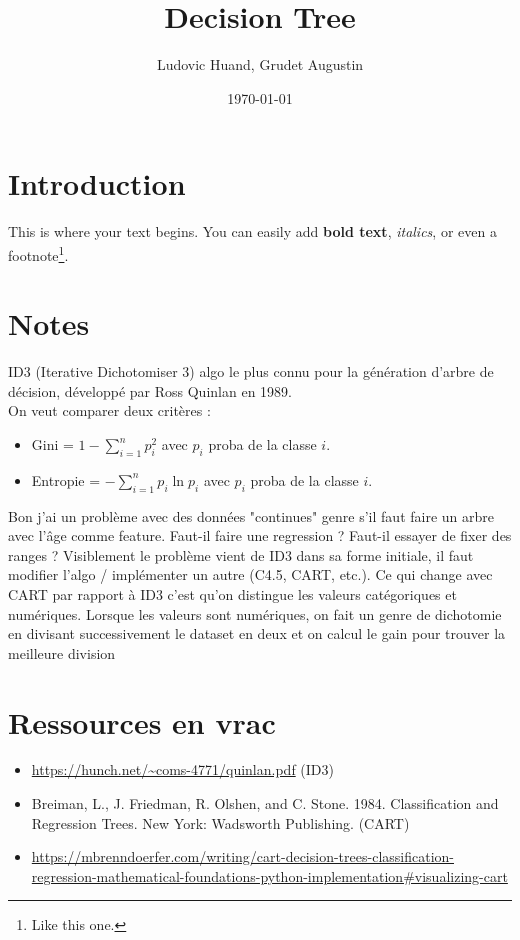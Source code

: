 \documentclass[11pt]{article}
\title{Decision Tree}
\author{Ludovic Huand, Grudet Augustin}
\date{\today}
\begin{document}
\maketitle

\section{Introduction}
This is where your text begins. You can easily add \textbf{bold text}, \textit{italics}, or even a footnote\footnote{Like this one.}.

\section{Notes}
ID3 (Iterative Dichotomiser 3) algo le plus connu pour la génération d'arbre de décision, développé par Ross Quinlan en 1989. \\
On veut comparer deux critères :
\begin{itemize}
    \item Gini = $1 - \sum_{i=1}^n p_i^2$ avec $p_i$ proba de la classe $i$.
    \item Entropie = $- \sum_{i=1}^n p_i \ln{p_i}$ avec $p_i$ proba de la classe $i$.
\end{itemize}

Bon j'ai un problème avec des données "continues" genre s'il faut faire un arbre avec l'âge comme feature. Faut-il faire une regression ? Faut-il essayer de fixer des ranges ? Visiblement le problème vient de ID3 dans sa forme initiale, il faut modifier l'algo / implémenter un autre (C4.5, CART, etc.).
Ce qui change avec CART par rapport à ID3 c'est qu'on distingue les valeurs catégoriques et numériques. Lorsque les valeurs sont numériques, on fait un genre de dichotomie en divisant successivement le dataset en deux et on calcul le gain pour trouver la meilleure division

\section{Ressources en vrac}

\begin{itemize}
	\item \url{https://hunch.net/~coms-4771/quinlan.pdf} (ID3)
	\item Breiman, L., J. Friedman, R. Olshen, and C. Stone. 1984. Classification and Regression Trees. New York: Wadsworth Publishing. (CART)
	\item \url{https://mbrenndoerfer.com/writing/cart-decision-trees-classification-regression-mathematical-foundations-python-implementation#visualizing-cart}
\end{itemize}
\end{document}
